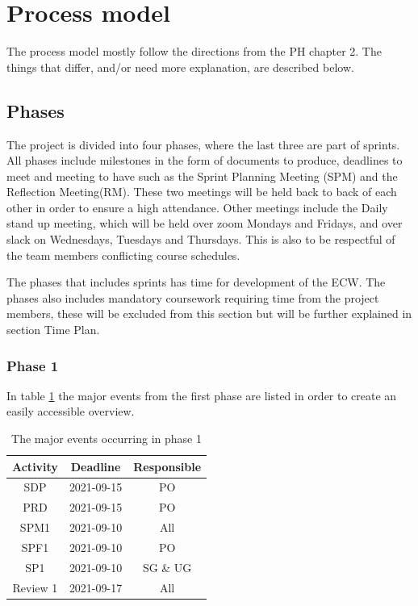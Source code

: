 \documentclass{article}
\begin{document}
\section{Process model}
The process model mostly follow the directions from the PH chapter 2. The things that differ, and/or need more explanation, are described below.
\subsection{Phases}
The project is divided into four phases, where the last three are part of sprints. All phases include milestones in the form of documents to produce, deadlines to meet and meeting to have such as the Sprint Planning Meeting (SPM) and the Reflection Meeting(RM). These two meetings will be held back to back of each other in order to ensure a high attendance. Other meetings include the Daily stand up meeting, which will be held over zoom Mondays and Fridays, and over slack on Wednesdays, Tuesdays and Thursdays. This is also to be respectful of the team members conflicting course schedules. 

The phases that includes sprints has time for development of the ECW. The phases also includes mandatory coursework requiring time from the project members, these will be excluded from this section but will be further explained in section Time Plan.
\subsubsection{Phase 1}
In table \ref{tab:phase1} the major events from the first phase are listed in order to create an easily accessible overview. 
\begin{table}[H]
    \centering
    \begin{tabular}{|c|c|c|}
    \hline
        Activity & Deadline & Responsible \\
        \hline \hline
        SDP & 2021-09-15 & PO \\
        \hline
        PRD & 2021-09-15 & PO \\
        \hline
        SPM1 & 2021-09-10 & All \\
        \hline
        SPF1 & 2021-09-10 & PO \\
        \hline
        SP1 & 2021-09-10 & SG \& UG \\
        \hline
        Review 1 & 2021-09-17 & All \\
        \hline
    \end{tabular}
    \caption{The major events occurring in phase 1}
    \label{tab:phase1}
\end{table}
\end{document}
